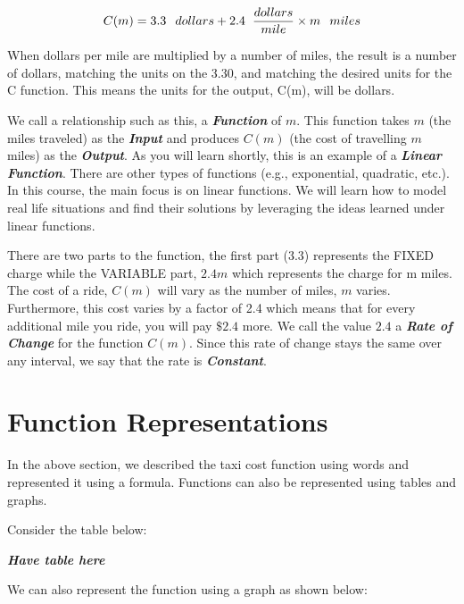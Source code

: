 \documentclass[
  letterpaper,
  DIV=11,
  numbers=noendperiod]{scrreprt}
\begin{document}
\[C(m)=3.3 \hspace{.1in} dollars + 2.4 \hspace{.08in} \frac{dollars}{mile} \times m\hspace{.1in} miles\]

When dollars per mile are multiplied by a number of miles, the result is
a number of dollars, matching the units on the 3.30, and matching the
desired units for the C function. This means the units for the output,
C(m), will be dollars.

We call a relationship such as this, a \textbf{\emph{Function}} of
\(m\). This function takes \(m\) (the miles traveled) as the
\textbf{\emph{Input}} and produces \(C(m)\) (the cost of travelling
\(m\) miles) as the \textbf{\emph{Output}}. As you will learn shortly,
this is an example of a \textbf{\emph{Linear Function}}. There are other
types of functions (e.g., exponential, quadratic, etc.). In this course,
the main focus is on linear functions. We will learn how to model real
life situations and find their solutions by leveraging the ideas learned
under linear functions.

There are two parts to the function, the first part (3.3) represents the
FIXED charge while the VARIABLE part, \(2.4m\) which represents the
charge for m miles. The cost of a ride, \(C(m)\) will vary as the number
of miles, \(m\) varies. Furthermore, this cost varies by a factor of 2.4
which means that for every additional mile you ride, you will pay
\(\$ 2.4\) more. We call the value \(2.4\) a \textbf{\emph{Rate of
Change}} for the function \(C(m)\). Since this rate of change stays the
same over any interval, we say that the rate is
\textbf{\emph{Constant}}.

\hypertarget{function-representations}{%
\section{Function Representations}\label{function-representations}}

In the above section, we described the taxi cost function using words
and represented it using a formula. Functions can also be represented
using tables and graphs.

Consider the table below:

\textbf{\emph{Have table here}}

We can also represent the function using a graph as shown below:
\end{document}
